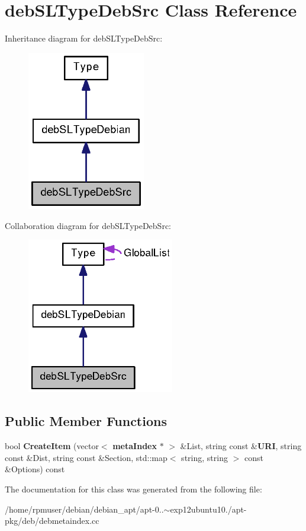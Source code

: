 \section{deb\-S\-L\-Type\-Deb\-Src \-Class \-Reference}
\label{classdebSLTypeDebSrc}


\-Inheritance diagram for deb\-S\-L\-Type\-Deb\-Src\-:
\nopagebreak
\begin{figure}[H]
\begin{center}
\leavevmode
\includegraphics[width=146pt]{classdebSLTypeDebSrc__inherit__graph}
\end{center}
\end{figure}


\-Collaboration diagram for deb\-S\-L\-Type\-Deb\-Src\-:
\nopagebreak
\begin{figure}[H]
\begin{center}
\leavevmode
\includegraphics[width=182pt]{classdebSLTypeDebSrc__coll__graph}
\end{center}
\end{figure}
\subsection*{\-Public \-Member \-Functions}
\begin{DoxyCompactItemize}
\item 
bool {\bfseries \-Create\-Item} (vector$<$ {\bf meta\-Index} $\ast$ $>$ \&\-List, string const \&{\bf \-U\-R\-I}, string const \&\-Dist, string const \&\-Section, std\-::map$<$ string, string $>$ const \&\-Options) const \label{classdebSLTypeDebSrc_a8776fe2f559ba3004185193a04c1a974}

\end{DoxyCompactItemize}


\-The documentation for this class was generated from the following file\-:\begin{DoxyCompactItemize}
\item 
/home/rpmuser/debian/debian\-\_\-apt/apt-\/0..$\sim$exp12ubuntu10./apt-\/pkg/deb/debmetaindex.\-cc\end{DoxyCompactItemize}
